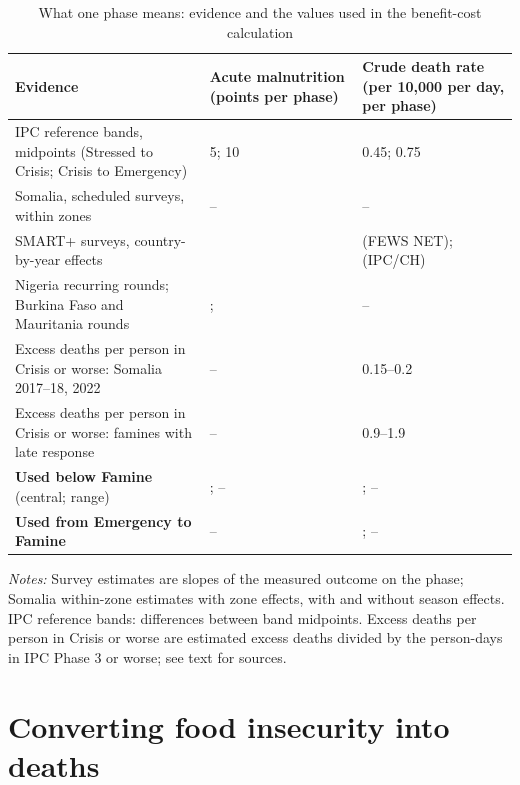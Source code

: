 \documentclass[11pt]{article}
\begin{document}
\begin{appendices}
\begin{table}[htbp]
\centering
\caption{What one phase means: evidence and the values used in the benefit-cost calculation}\label{tab:calibration}
\scriptsize
\begin{tabular}{L{5.6cm}L{2.6cm}L{3.0cm}}
\toprule
Evidence & Acute malnutrition (points per phase) & Crude death rate (per 10,000 per day, per phase) \\
\midrule
IPC reference bands, midpoints (Stressed to Crisis; Crisis to Emergency) & 5; 10 & 0.45; 0.75 \\
Somalia, scheduled surveys, within zones & \wzGamZoneSeason{}--\wzGamZone{} & \wzCdrZoneSeason{}--\wzCdrZone{} \\
SMART+ surveys, country-by-year effects & \spSlope{} & \spCdrSlope{} (FEWS NET); \spCdrSlopeIpc{} (IPC/CH) \\
Nigeria recurring rounds; Burkina Faso and Mauritania rounds & \ngSlope{}; \fdwSlope{} & -- \\
Excess deaths per person in Crisis or worse: Somalia 2017--18, 2022 & -- & 0.15--0.2 \\
Excess deaths per person in Crisis or worse: famines with late response & -- & 0.9--1.9 \\
\midrule
\textbf{Used below Famine} (central; range) & \calGamMid{}; \calGamLo{}--\calGamHi{} & \calCdrMid{}; \calCdrLo{}--\calCdrHi{} \\
\textbf{Used from Emergency to Famine} & -- & \calFamMid{}; \calFamLo{}--\calFamHi{} \\
\bottomrule
\end{tabular}
\par\vspace{4pt}\begin{minipage}{\textwidth}\scriptsize \textit{Notes:} Survey estimates are slopes of the measured outcome on the phase; Somalia within-zone estimates with zone effects, with and without season effects. IPC reference bands: differences between band midpoints. Excess deaths per person in Crisis or worse are estimated excess deaths divided by the person-days in IPC Phase 3 or worse; see text for sources.\end{minipage}
\end{table}


\section{Converting food insecurity into deaths}\label{app:lives}


\end{appendices}
\end{document}
